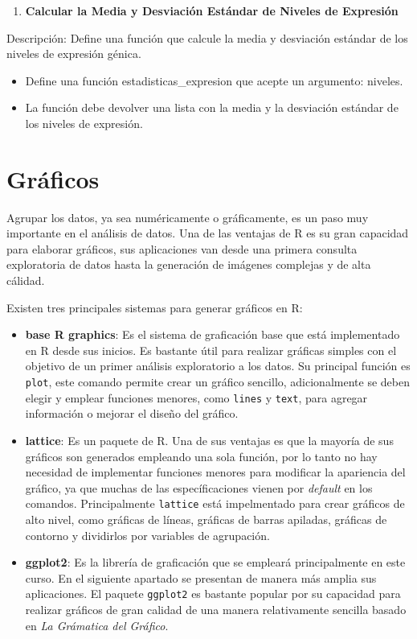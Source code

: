 \documentclass[
]{book}
\providecommand{\tightlist}{%
  \setlength{\itemsep}{0pt}\setlength{\parskip}{0pt}}
\begin{document}
\begin{enumerate}
\def\labelenumi{\arabic{enumi}.}
\setcounter{enumi}{14}
\tightlist
\item
  \textbf{Calcular la Media y Desviación Estándar de Niveles de Expresión}
\end{enumerate}

Descripción: Define una función que calcule la media y desviación estándar de los niveles de expresión génica.

\begin{itemize}
\tightlist
\item
  Define una función estadisticas\_expresion que acepte un argumento: niveles.
\item
  La función debe devolver una lista con la media y la desviación estándar de los niveles de expresión.
\end{itemize}

\chapter{Gráficos}\label{plots}

Agrupar los datos, ya sea numéricamente o gráficamente, es un paso muy importante en el análisis de datos. Una de las ventajas de R es su gran capacidad para elaborar gráficos, sus aplicaciones van desde una primera consulta exploratoria de datos hasta la generación de imágenes complejas y de alta cálidad.

Existen tres principales sistemas para generar gráficos en R:

\begin{itemize}
\item
  \textbf{base R graphics}: Es el sistema de graficación base que está implementado en R desde sus inicios. Es bastante útil para realizar gráficas simples con el objetivo de un primer análisis exploratorio a los datos. Su principal función es \texttt{plot}, este comando permite crear un gráfico sencillo, adicionalmente se deben elegir y emplear funciones menores, como \texttt{lines} y \texttt{text}, para agregar información o mejorar el diseño del gráfico.
\item
  \textbf{lattice}: Es un paquete de R. Una de sus ventajas es que la mayoría de sus gráficos son generados empleando una sola función, por lo tanto no hay necesidad de implementar funciones menores para modificar la apariencia del gráfico, ya que muchas de las específicaciones vienen por \emph{default} en los comandos. Principalmente \texttt{lattice} está impelmentado para crear gráficos de alto nivel, como gráficas de líneas, gráficas de barras apiladas, gráficas de contorno y dividirlos por variables de agrupación.
\item
  \textbf{ggplot2}: Es la librería de graficación que se empleará principalmente en este curso. En el siguiente apartado se presentan de manera más amplia sus aplicaciones. El paquete \texttt{ggplot2} es bastante popular por su capacidad para realizar gráficos de gran calidad de una manera relativamente sencilla basado en \emph{La Grámatica del Gráfico}.
\end{itemize}
\end{document}
